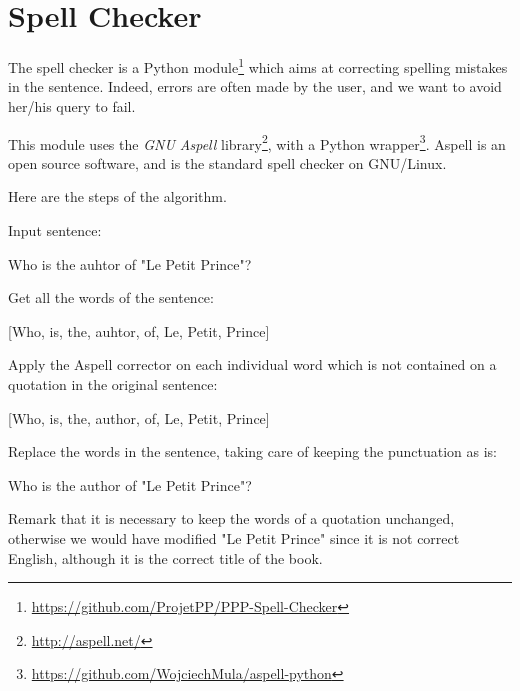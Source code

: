 \section{Spell Checker}

The spell checker is a Python module\footnote{\url{https://github.com/ProjetPP/PPP-Spell-Checker}}
which aims at correcting spelling mistakes in the sentence.
Indeed, errors are often made by the user, and we want to avoid her/his query to fail.

This module uses the \emph{GNU Aspell} library\footnote{\url{http://aspell.net/}},
with a Python wrapper\footnote{\url{https://github.com/WojciechMula/aspell-python}}.
Aspell is an open source software, and is the standard spell checker on GNU/Linux.

Here are the steps of the algorithm.

Input sentence:
\begin{center}
Who is the auhtor of "Le Petit Prince"?
\end{center}

Get all the words of the sentence:
\begin{center}
[Who, is, the, auhtor, of, Le, Petit, Prince]
\end{center}

Apply the Aspell corrector on each individual word which is not contained on a
quotation in the original sentence:
\begin{center}
[Who, is, the, author, of, Le, Petit, Prince]
\end{center}

Replace the words in the sentence, taking care of keeping the punctuation as is:
\begin{center}
Who is the author of "Le Petit Prince"?
\end{center}

Remark that it is necessary to keep the words of a quotation unchanged, otherwise
we would have modified "Le Petit Prince" since it is not correct English, although
it is the correct title of the book.
